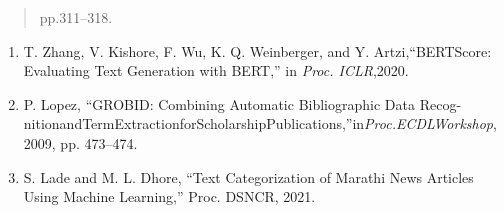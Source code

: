 \documentclass[
]{article}
\begin{document}
\begin{quote}
\protect{}\label{_bookmark61}{}pp.311--318.
\end{quote}

\begin{enumerate}
\def\labelenumi{\arabic{enumi}.}
\setcounter{enumi}{52}
\item
  T. Zhang, V. Kishore, F. Wu, K. Q. Weinberger, and Y. Artzi,``BERTScore: Evaluating Text Generation with BERT,'' in \emph{Proc. ICLR},\protect{}\label{_bookmark62}{}2020.
\item
  P. Lopez, ``GROBID: Combining Automatic Bibliographic Data Recog-nitionandTermExtractionforScholarshipPublications,''in\emph{Proc.ECDLWorkshop}, 2009, pp. 473--474.
\item
  S. Lade and M. L. Dhore, ``Text Categorization of Marathi News Articles Using Machine Learning,'' Proc. DSNCR, 2021.
\end{enumerate}
\end{document}
